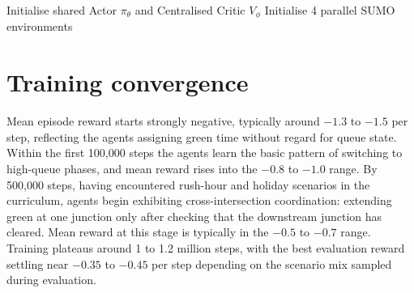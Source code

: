 \documentclass[11pt, a4paper]{report}
\begin{document}
\begin{algorithm}[H]
\caption{MAPPO training loop (parameter sharing, centralised critic)}
\DontPrintSemicolon
Initialise shared Actor $\pi_\theta$ and Centralised Critic $V_\phi$\;
Initialise 4 parallel SUMO environments\;
\end{algorithm}

\section{Training convergence}

Mean episode reward starts strongly negative, typically around $-1.3$ to $-1.5$ per step, reflecting the agents assigning green time without regard for queue state. Within the first 100,000 steps the agents learn the basic pattern of switching to high-queue phases, and mean reward rises into the $-0.8$ to $-1.0$ range. By 500,000 steps, having encountered rush-hour and holiday scenarios in the curriculum, agents begin exhibiting cross-intersection coordination: extending green at one junction only after checking that the downstream junction has cleared. Mean reward at this stage is typically in the $-0.5$ to $-0.7$ range. Training plateaus around 1 to 1.2 million steps, with the best evaluation reward settling near $-0.35$ to $-0.45$ per step depending on the scenario mix sampled during evaluation.
\end{document}
